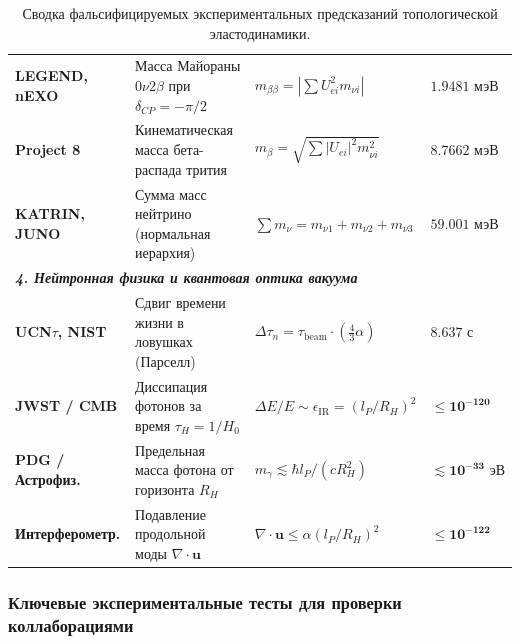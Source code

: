 \documentclass[12pt,a4paper]{article}
\begin{document}
\begin{table}[H]
\begin{tabularx}{\textwidth}{p{2.8cm} p{4.6cm} p{4.6cm} >{\raggedleft\arraybackslash}X}
			\textbf{LEGEND, nEXO} & Масса Майораны $0\nu 2\beta$ при $\delta_{CP}=-\pi/2$ & $m_{\beta\beta} = |\sum U_{ei}^2 m_{\nu i}|$ & $\mathbf{1.9481 \text{ мэВ}}$ \\
			\textbf{Project 8} & Кинематическая масса бета-распада трития & $m_\beta = \sqrt{\sum |U_{ei}|^2 m_{\nu i}^2}$ & $\mathbf{8.7662 \text{ мэВ}}$ \\
			\textbf{KATRIN, JUNO} & Сумма масс нейтрино (нормальная иерархия) & $\sum m_\nu = m_{\nu 1} + m_{\nu 2} + m_{\nu 3}$ & $\mathbf{59.001 \text{ мэВ}}$ \\
			\midrule
			\multicolumn{4}{l}{\textit{\textbf{4. Нейтронная физика и квантовая оптика вакуума}}} \\
			\textbf{UCN$\tau$, NIST} & Сдвиг времени жизни в ловушках (Парселл) & $\Delta \tau_n = \tau_{\text{beam}} \cdot (\frac{4}{3}\alpha)$ & $\mathbf{8.637 \text{ с}}$ \\
			\textbf{JWST / CMB} & Диссипация фотонов за время $\tau_H = 1/H_0$ & $\Delta E / E \sim \epsilon_{\text{IR}} = (l_P / R_H)^2$ & $\mathbf{\le 10^{-120}}$ \\
			\textbf{PDG / Астрофиз.} & Предельная масса фотона от горизонта $R_H$ & $m_\gamma \lesssim \hbar l_P / (c R_H^2)$ & $\mathbf{\lesssim 10^{-33} \text{ эВ}}$ \\
			\textbf{Интерферометр.} & Подавление продольной моды $\nabla\cdot\mathbf{u}$ & $\nabla\cdot\mathbf{u} \le \alpha (l_P / R_H)^2$ & $\mathbf{\le 10^{-122}}$ \\
			\bottomrule
		\end{tabularx}
		\caption{Сводка фальсифицируемых экспериментальных предсказаний топологической эластодинамики.}
		\label{tab:accelerator_predictions_detailed}
	\end{table}
		
	\subsubsection{Ключевые экспериментальные тесты для проверки коллаборациями}
	
\end{document}

